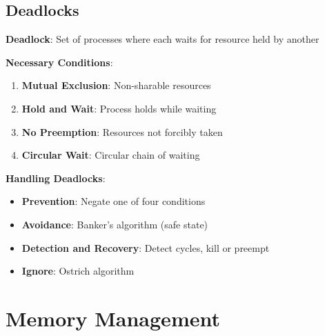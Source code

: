 \documentclass[12pt,a4paper]{report}
\begin{document}
\subsection{Deadlocks}
\begin{concept}
\textbf{Deadlock}: Set of processes where each waits for resource held by another

\textbf{Necessary Conditions}:
\begin{enumerate}
    \item \textbf{Mutual Exclusion}: Non-sharable resources
    \item \textbf{Hold and Wait}: Process holds while waiting
    \item \textbf{No Preemption}: Resources not forcibly taken
    \item \textbf{Circular Wait}: Circular chain of waiting
\end{enumerate}

\textbf{Handling Deadlocks}:
\begin{itemize}
    \item \textbf{Prevention}: Negate one of four conditions
    \item \textbf{Avoidance}: Banker's algorithm (safe state)
    \item \textbf{Detection and Recovery}: Detect cycles, kill or preempt
    \item \textbf{Ignore}: Ostrich algorithm
\end{itemize}
\end{concept}

\section{Memory Management}
\end{document}
